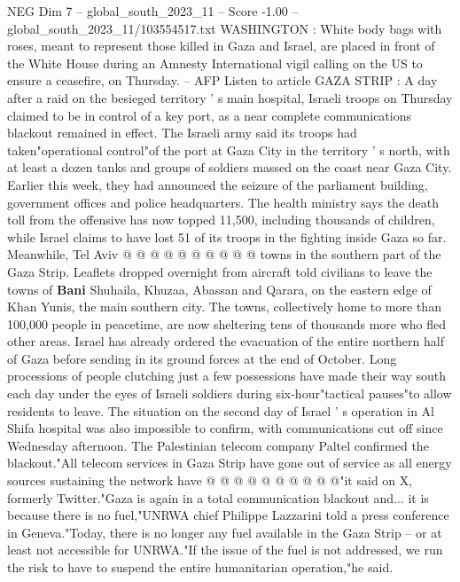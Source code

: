 \begin{textsample}{NEG Dim 7 – global\_south\_2023\_11 – Score -1.00 – global\_south\_2023\_11/103554517.txt}  \label{ex:f7_neg_158}
WASHINGTON : White body bags with roses, meant to represent those killed in Gaza and Israel, are placed in front of the White House during an Amnesty International vigil calling on the US to ensure a ceasefire, on Thursday. -- AFP Listen to article GAZA STRIP : A day after a raid on the besieged territory ' s main hospital, Israeli troops on Thursday claimed to be in control of a key port, as a near complete communications blackout remained in effect.
The Israeli army said its troops had taken"operational control"of the port at Gaza City in the territory ' s north, with at least a dozen tanks and groups of soldiers massed on the coast near Gaza City.
Earlier this week, they had announced the seizure of the parliament building, government offices and police headquarters.
The health ministry says the death toll from the offensive has now topped 11,500, including thousands of children, while Israel claims to have lost 51 of its troops in the fighting inside Gaza so far.
Meanwhile, Tel Aviv @ @ @ @ @ @ @ @ @ @ towns in the southern part of the Gaza Strip.
Leaflets dropped overnight from aircraft told civilians to leave the towns of \textbf{Bani} Shuhaila, Khuzaa, Abassan and Qarara, on the eastern edge of Khan Yunis, the main southern city.
The towns, collectively home to more than 100,000 people in peacetime, are now sheltering tens of thousands more who fled other areas.
Israel has already ordered the evacuation of the entire northern half of Gaza before sending in its ground forces at the end of October.
Long processions of people clutching just a few possessions have made their way south each day under the eyes of Israeli soldiers during six-hour"tactical pauses"to allow residents to leave.
The situation on the second day of Israel ' s operation in Al Shifa hospital was also impossible to confirm, with communications cut off since Wednesday afternoon.
The Palestinian telecom company Paltel confirmed the blackout."All telecom services in Gaza Strip have gone out of service as all energy sources sustaining the network have @ @ @ @ @ @ @ @ @ @"it said on X, formerly Twitter."Gaza is again in a total communication blackout and... it is because there is no fuel,"UNRWA chief Philippe Lazzarini told a press conference in Geneva."Today, there is no longer any fuel available in the Gaza Strip -- or at least not accessible for UNRWA."If the issue of the fuel is not addressed, we run the risk to have to suspend the entire humanitarian operation,"he said.

\end{textsample}
